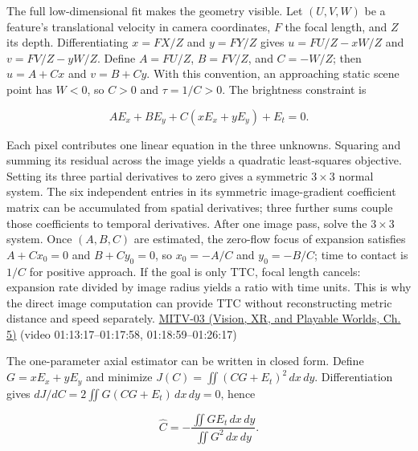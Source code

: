 The full low-dimensional fit makes the geometry visible. Let \((U,V,W)\) be a feature's translational velocity in camera coordinates, \(F\) the focal length, and \(Z\) its depth. Differentiating \(x=FX/Z\) and \(y=FY/Z\) gives \(u=FU/Z-xW/Z\) and \(v=FV/Z-yW/Z\). Define \(A=FU/Z\), \(B=FV/Z\), and \(C=-W/Z\); then \(u=A+Cx\) and \(v=B+Cy\). With this convention, an approaching static scene point has \(W<0\), so \(C>0\) and \(\tau=1/C>0\). The brightness constraint is

\[
AE_x+BE_y+C(xE_x+yE_y)+E_t=0.
\]

Each pixel contributes one linear equation in the three unknowns. Squaring and summing its residual across the image yields a quadratic least-squares objective. Setting its three partial derivatives to zero gives a symmetric \(3\times3\) normal system. The six independent entries in its symmetric image-gradient coefficient matrix can be accumulated from spatial derivatives; three further sums couple those coefficients to temporal derivatives. After one image pass, solve the \(3\times3\) system. Once \((A,B,C)\) are estimated, the zero-flow focus of expansion satisfies \(A+Cx_0=0\) and \(B+Cy_0=0\), so \(x_0=-A/C\) and \(y_0=-B/C\); time to contact is \(1/C\) for positive approach. If the goal is only TTC, focal length cancels: expansion rate divided by image radius yields a ratio with time units. This is why the direct image computation can provide TTC without reconstructing metric distance and speed separately. \href{../07-Vision-XR-and-Playable-Worlds/main.pdf\#nameddest=04-visual-computing-ii-ch036-mitv-03---time-to-contact-focus-of-expansion-direct-motion-vision-methods-noise-gain}{MITV-03 (Vision, XR, and Playable Worlds, Ch. 5)} (video 01:13:17--01:17:58, 01:18:59--01:26:17)

The one-parameter axial estimator can be written in closed form. Define \(G=xE_x+yE_y\) and minimize \(J(C)=\iint (CG+E_t)^2\,dx\,dy\). Differentiation gives \(dJ/dC=2\iint G(CG+E_t)\,dx\,dy=0\), hence

\[
\widehat C=-\frac{\iint GE_t\,dx\,dy}{\iint G^2\,dx\,dy}.
\]

